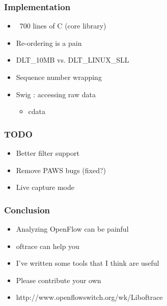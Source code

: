 \documentclass[14pt]{beamer}
\newcommand{\subbullet}[1]{\begin{itemize}\item #1\end{itemize}}
\begin{document}
\begin{frame}
\frametitle{Implementation}
\begin{itemize}
\item ~700 lines of C (core library)
\item Re-ordering is a pain
\item DLT\_10MB vs. DLT\_LINUX\_SLL
\item Sequence number wrapping 
\item Swig : accessing raw data
\subbullet{cdata}
\end{itemize}
\end{frame}
\begin{frame}
\frametitle{TODO}
\begin{itemize}
\item Better filter support
\item Remove PAWS bugs (fixed?)
\item Live capture mode
\end{itemize}
\end{frame}
\begin{frame}
\frametitle{Conclusion}
\begin{itemize}
\item Analyzing OpenFlow can be painful
\item oftrace can help you
\item I've written some tools that I think are useful
\item Please contribute your own 
\item http://www.openflowswitch.org/wk/Liboftrace
\end{itemize}
\end{frame}
\end{document}
